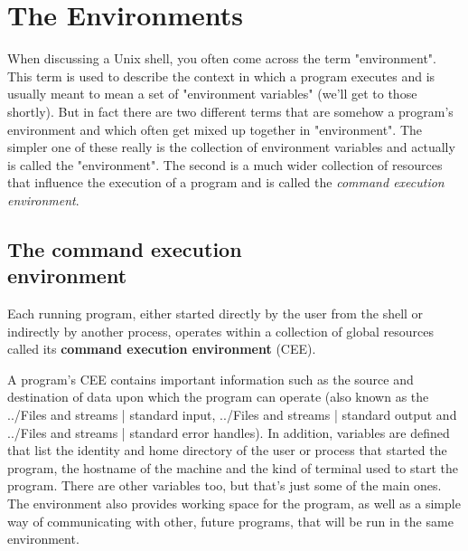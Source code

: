 \section{The Environments}
When discussing a Unix shell, you often come across the term "environment".
This term is used to describe the context in which a program executes and is
usually meant to mean a set of "environment variables" (we'll get to those
shortly). But in fact there are two different terms that are somehow a
program's environment and which often get mixed up together in "environment".
The simpler one of these really is the collection of environment variables and
actually is called the "environment". The second is a much wider collection of
resources that influence the execution of a program and is called the
\textit{command execution environment}.

\subsection{The command execution\\ environment}
Each running program, either started directly by the user from the shell or
indirectly by another process, operates within a collection of global resources
called its \textbf{command execution environment} (CEE).

A program's CEE contains important information such as the source and
destination of data upon which the program can operate (also known as the
../Files and streams | standard input, ../Files and streams | standard output
and ../Files and streams | standard error handles). In addition, variables are
defined that list the identity and home directory of the user or process that
started the program, the hostname of the machine and the kind of terminal used
to start the program. There are other variables too, but that's just some of
the main ones. The environment also provides working space for the program, as
well as a simple way of communicating with other, future programs, that will be
run in the same environment. 

